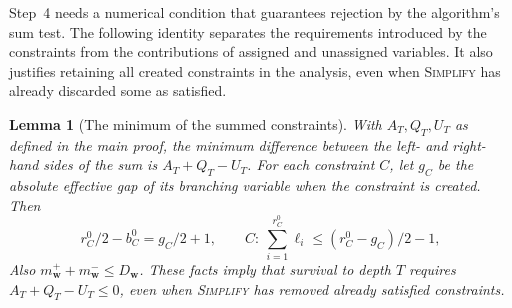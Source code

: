 \documentclass[11pt,a4paper]{article}
\newtheorem{lemma}[theorem]{Lemma}
\theoremstyle{definition}
\theoremstyle{remark}
\begin{document}
Step~4 needs a numerical condition that guarantees rejection by the
algorithm's sum test. The following identity separates the requirements
introduced by the constraints from the contributions of assigned and
unassigned variables. It also justifies retaining all created constraints
in the analysis, even when \textnormal{\textsc{Simplify}} has already
discarded some as satisfied.

\begin{lemma}[The minimum of the summed constraints]\label{lem:bias_sum}
With $A_T,Q_T,U_T$ as defined in the main proof, the minimum difference
between the left- and right-hand sides of the sum is $A_T+Q_T-U_T$.
For each constraint $C$, let $g_C$ be the absolute effective gap of its
branching variable when the constraint is created. Then
\begin{equation}
 r_C^0/2-b_C^0=g_C/2+1,\qquad
 C:\ \sum_{i=1}^{r_C^0}\ell_i\le(r_C^0-g_C)/2-1,
 \label{eq:cardcut}
\end{equation}
Also
$m_{\mathbf w}^++m_{\mathbf w}^-\le D_{\mathbf w}$.
These facts imply that survival to depth $T$ requires $A_T+Q_T-U_T\le0$,
even when \textnormal{\textsc{Simplify}} has removed already satisfied constraints.
\end{lemma}
\end{document}
